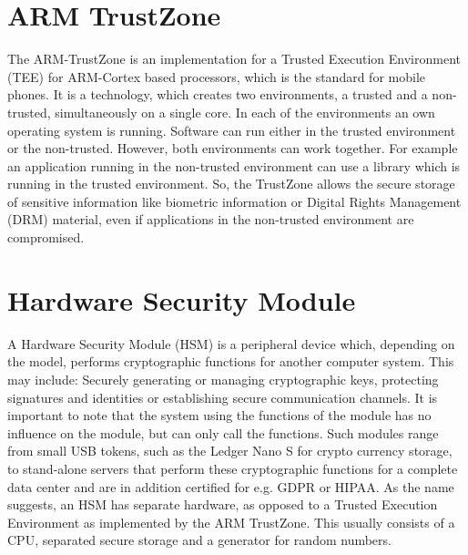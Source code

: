 \documentclass[12pt,oneside,a4paper,parskip]{scrbook}
\begin{document}

\section{ARM TrustZone}
\label{arm:TrustZone}

The ARM-TrustZone is an implementation for a Trusted Execution Environment (TEE) for ARM-Cortex based processors, which is the standard for mobile phones. It is a technology, which creates two environments, a trusted and a non-trusted, simultaneously on a single core. In each of the environments an own operating system is running. Software can run either in the trusted environment or the non-trusted. However, both environments can work together. For example an application running in the non-trusted environment can use a library which is running in the trusted environment. So, the TrustZone allows the secure storage of sensitive information like biometric information or Digital Rights Management (DRM) material, even if applications in the non-trusted environment are compromised.
\parencite{fowler_trustzone_2017}

\section{Hardware Security Module}
\label{sec:HSM}

A Hardware Security Module (HSM) is a peripheral device which, depending on the model, performs cryptographic functions for another computer system. This may include: Securely generating or managing cryptographic keys, protecting signatures and identities or establishing secure communication channels. It is important to note that the system using the functions of the module has no influence on the module, but can only call the functions. Such modules range from small USB tokens, such as the Ledger Nano S for crypto currency storage, to stand-alone servers that perform these cryptographic functions for a complete data center and are in addition certified for e.g. GDPR or HIPAA. As the name suggests, an HSM has separate hardware, as opposed to a Trusted Execution Environment as implemented by the ARM TrustZone. This usually consists of a CPU, separated secure storage and a generator for random numbers.
\parencite{sustek_hardware_2011}
\end{document}

